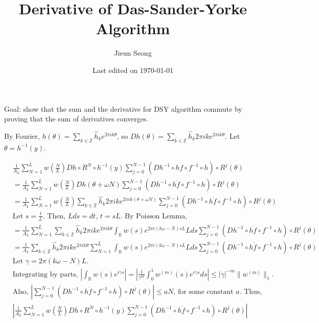\documentclass[12pt]{article}
\title{Derivative of Das-Sander-Yorke Algorithm}
\author{Jieun Seong}
\date{Last edited on \today}
\newcommand{\Z}{\mathbb{Z}}
\newcommand{\R}{\mathbb{R}}
\newcommand{\hk}{\widehat{h}_k}
\begin{document}

Goal: show that the sum and the derivative for DSY algorithm commute by proving that the sum of derivatives converges.

\vfill

By Fourier, $h(\theta)=\sum_{k\in\Z}\hk e^{2\pi i k \theta}$, so $Dh(\theta)=\sum_{k\in\Z} \hk 2\pi i k e^{2\pi i k \theta}$. Let $\theta = h^{-1}(y)$. 

\begin{equation*}\begin{split}
     &\frac{1}{A_L} \sum_{N=1}^L w\left(\frac{N}{L}\right) Dh \circ R^N \circ h^{-1}(y) \sum_{j=0}^{N-1} (Dh^{-1} \circ h \Dot{f} \circ f^{-1} \circ h) \circ R^j (\theta)\\
     &= \frac{1}{A_L}\sum_{N=1}^L w\left(\frac{N}{L}\right) Dh(\theta+\omega N) \sum_{j=0}^{N-1} (Dh^{-1} \circ h \Dot{f} \circ f^{-1} \circ h) \circ R^j (\theta)\\
     &= \frac{1}{A_L}\sum_{N=1}^L w\left(\frac{N}{L}\right) \sum_{k\in\Z}\hk 2 \pi i k e^{2\pi i k (\theta+\omega N)} \sum_{j=0}^{N-1} (Dh^{-1} \circ h \Dot{f} \circ f^{-1} \circ h) \circ R^j (\theta)\\
     &\text{Let $s=\frac{t}{L}$. Then, $Lds=dt$, $t=sL$. By Poisson Lemma,}\\
     &= \frac{1}{A_L}\sum_{N=1}^L \sum_{k\in\Z}\hk 2 \pi i k e^{2\pi i k \theta} \int_\R w(s)e^{2 \pi i (k\omega - N) sL}Lds \sum_{j=0}^{N-1} (Dh^{-1} \circ h \Dot{f} \circ f^{-1} \circ h) \circ R^j (\theta)\\
     &=\frac{1}{A_L} \sum_{k\in\Z}\hk 2 \pi i k e^{2\pi i k \theta} \sum_{N=1}^L \int_\R w(s)e^{2 \pi i (k\omega - N) sL}Lds \sum_{j=0}^{N-1} (Dh^{-1} \circ h \Dot{f} \circ f^{-1} \circ h) \circ R^j (\theta)\\
     &\text{Let $\gamma = 2\pi(k\omega-N)L$.} \\
     &\text{Integrating by parts, $\left| \int_\R w(s)e^{i\gamma s} \right| = \left| \frac{1}{\gamma^m} \int_0^1 w^{(m)}(s)e^{i\gamma s}ds\right| \leq |\gamma|^{-m}\|w^{(m)}\|_1. $}\\
     &\text{Also, $\left|\sum_{j=0}^{N-1} (Dh^{-1} \circ h \Dot{f} \circ f^{-1} \circ h) \circ R^j (\theta)\right|\leq aN$, for some constant $a$. Thus,}\\
     &\left| \frac{1}{A_L} \sum_{N=1}^L w\left(\frac{N}{L}\right) Dh \circ R^N \circ h^{-1}(y) \sum_{j=0}^{N-1} (Dh^{-1} \circ h \Dot{f} \circ f^{-1} \circ h) \circ R^j (\theta) \right| \\

\end{split}
\end{equation*}
\end{document}
